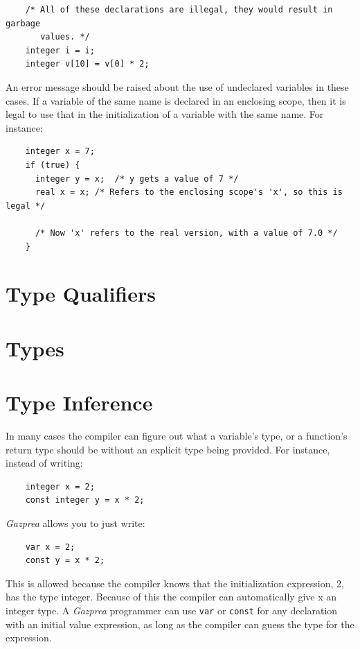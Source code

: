 \documentclass{article}
\begin{document}
  \begin{lstlisting}
    /* All of these declarations are illegal, they would result in garbage
       values. */
    integer i = i;
    integer v[10] = v[0] * 2;
  \end{lstlisting}

  An error message should be raised about the use of undeclared variables in these cases. If a variable of the same
  name is declared in an enclosing scope, then it is legal to use that in the initialization of a variable with the
  same name. For instance:

  \begin{lstlisting}
    integer x = 7;
    if (true) {
      integer y = x;  /* y gets a value of 7 */
      real x = x; /* Refers to the enclosing scope's 'x', so this is legal */

      /* Now 'x' refers to the real version, with a value of 7.0 */
    }
  \end{lstlisting}


\section{Type Qualifiers}
\label{sec:typeQualifiers}


\section{Types}
\label{sec:types}



\section{Type Inference}\label{sec:typeInference}


  In many cases the compiler can figure out what a variable's type, or a function's return type should be without an
  explicit type being provided. For instance, instead of writing:

  \begin{lstlisting}
    integer x = 2;
    const integer y = x * 2;
  \end{lstlisting}

  \textit{Gazprea} allows you to just write:

  \begin{lstlisting}
    var x = 2;
    const y = x * 2;
  \end{lstlisting}

  This is allowed because the compiler knows that the initialization expression, 2, has the type integer. Because of
  this the compiler can automatically give x an integer type. A \textit{Gazprea} programmer can use \texttt{var} or
  \texttt{const} for any declaration with an initial value expression, as long as the compiler can guess the type for
  the expression.
\end{document}
